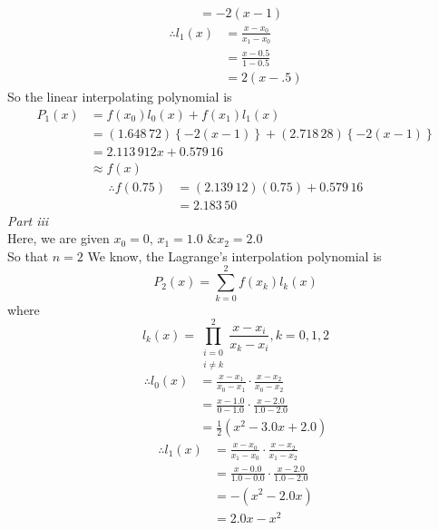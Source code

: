 \documentclass[12pt,class=book,crop=false]{standalone}
\begin{document}
\begin{soln}
\begin{align*}
                          & =-2(x-1)
    \end{align*}
    \begin{align*}
        \therefore l_1(x) & = \frac{x-x_0}{x_1-x_0} \\
                          & = \frac{x-0.5}{1-0.5}   \\
                          & =2(x-.5)
    \end{align*}
    So the linear interpolating polynomial is
    \begin{align*}
        P_1(x) & = f(x_0)l_0(x)+f(x_1)l_1(x)                                       \\
               & = (1.648\,72)\left\{-2(x-1)\right\}+(2.718\,28)\left\{-2(x-1)\right\} \\
               & =2.113\,912x+0.579\,16                                                \\
               & \approx f(x)
    \end{align*}
    \begin{align*}
        \therefore f(0.75) & = (2.139\,12)(0.75)+0.579\,16 \\
                           & =2.183\,50
    \end{align*}
    \emph{Part iii}\\
    Here, we are given \(  x_0=0,\,x_1=1.0 \text{ \& }x_2=2.0 \)\\So that \(  n=2 \)
    We know, the Lagrange's interpolation polynomial is
    \[
        P_2(x)=\sum_{k=0}^2f(x_k)l_k(x)
    \]
    where
    \[
        l_k(x)=\prod_{\substack{i=0\\ i\neq k}}^2\frac{x-x_i}{x_k-x_i}, k=0,1,2
    \]
    \begin{align*}
        \therefore l_0(x) & = \frac{x-x_1}{x_0-x_1}\cdot\frac{x-x_2}{x_0-x_2} \\
                          & = \frac{x-1.0}{0-1.0}\cdot\frac{x-2.0}{1.0-2.0}   \\
                          & =\frac{1}{2}(x^2-3.0x+2.0)
    \end{align*}
    \begin{align*}
        \therefore l_1(x) & = \frac{x-x_0}{x_1-x_0}\cdot\frac{x-x_2}{x_1-x_2} \\
                          & = \frac{x-0.0}{1.0-0.0}\cdot\frac{x-2.0}{1.0-2.0} \\
                          & = -(x^2-2.0x)                                     \\
                          & = 2.0x-x^2
    \end{align*}

\end{soln}
\end{document}
